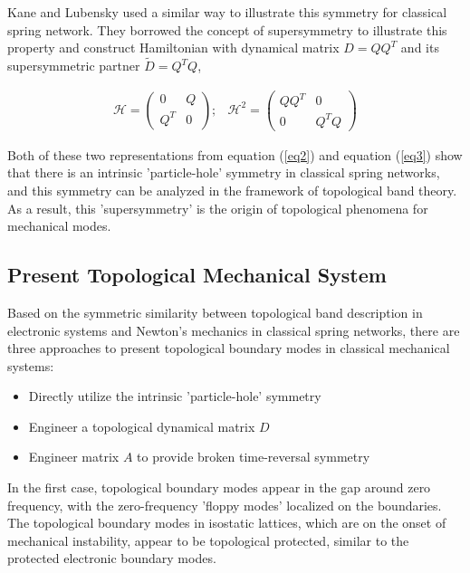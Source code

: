 \documentclass[aps,pre,preprint,groupedaddress]{revtex4-1}
\begin{document}
Kane and Lubensky used a similar way to illustrate this symmetry for classical spring network\cite{cite-key10}. They borrowed the concept of supersymmetry to illustrate this property and construct Hamiltonian with dynamical matrix $D = QQ^T$ and its supersymmetric partner $\tilde{D} = Q^TQ$,

\begin{align}
\mathcal{H} = 
\begin{pmatrix}
0 & Q\\
Q^T & 0
\end{pmatrix};
&\mathcal{H}^2 = 
\begin{pmatrix}
QQ^T & 0\\
0 & Q^TQ
\end{pmatrix}
\label{eq3}
\end{align}

Both of these two representations from equation (\ref{eq2}) and equation (\ref{eq3}) show that there is an intrinsic 'particle-hole' symmetry in classical spring networks, and this symmetry can be analyzed in the framework of topological band theory\cite{cite-key2}. As a result, this 'supersymmetry' is the origin of topological phenomena for mechanical modes.

\subsection{Present Topological Mechanical System}

Based on the symmetric similarity between topological band description in electronic systems and Newton's mechanics in classical spring networks, there are three approaches to present topological boundary modes in classical mechanical systems:
\begin{itemize}
\item Directly utilize the intrinsic 'particle-hole' symmetry
\item Engineer a topological dynamical matrix $D$
\item Engineer matrix $A$ to provide broken time-reversal symmetry
\end{itemize}

In the first case, topological boundary modes appear in the gap around zero frequency, with the zero-frequency 'floppy modes' localized on the boundaries. The topological boundary modes in isostatic lattices, which are on the onset of mechanical instability, appear to be topological protected, similar to the protected electronic boundary modes.
\end{document}
